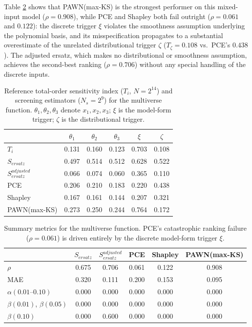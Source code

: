 \documentclass[12pt]{article}
\begin{document}
Table \ref{tab:multiverse_summary} shows that PAWN(max-KS) is the strongest performer on this mixed-input model ($\rho=0.908$), while PCE and Shapley both fail outright ($\rho=0.061$ and $0.122$): the discrete trigger $\xi$ violates the smoothness assumption underlying the polynomial basis, and its misspecification propagates to a substantial overestimate of the unrelated distributional trigger $\zeta$ ($T_\zeta=0.108$ vs.\ PCE's $0.438$). The adjusted ersatz, which makes no distributional or smoothness assumption, achieves the second-best ranking ($\rho=0.706$) without any special handling of the discrete inputs.

\begin{table}[H]
\centering
\begin{tabular}{@{}lccccc@{}} \toprule
 & $\theta_1$ & $\theta_2$ & $\theta_3$ & $\xi$ & $\zeta$ \\ \midrule
$T_i$                   & 0.131 & 0.160 & 0.123 & 0.703 & 0.108 \\
$S_{ersatz}$            & 0.497 & 0.514 & 0.512 & 0.628 & 0.522 \\
$S^{adjusted}_{ersatz}$ & 0.066 & 0.074 & 0.060 & 0.365 & 0.110 \\
PCE                     & 0.206 & 0.210 & 0.183 & 0.220 & 0.438 \\
Shapley                 & 0.167 & 0.161 & 0.144 & 0.207 & 0.321 \\
PAWN(max-KS)            & 0.273 & 0.250 & 0.244 & 0.764 & 0.172 \\ \bottomrule
\end{tabular}
\caption{Reference total-order sensitivity index ($T_i$, $N=2^{14}$) and screening estimators ($N_s=2^9$) for the \citet{saltelli2025} multiverse function. $\theta_1,\theta_2,\theta_3$ denote $x_1,x_2,x_3$; $\xi$ is the model-form trigger; $\zeta$ is the distributional trigger.}
\label{tab:multiverse_function}
\end{table}

\begin{table}[H]
\centering
\begin{tabular}{@{}l|ccccc@{}} \toprule
 & $S_{ersatz}$ & $S^{adjusted}_{ersatz}$ & PCE & Shapley & PAWN(max-KS) \\ \midrule
$\rho$           & 0.675 & 0.706 & 0.061 & 0.122 & 0.908 \\
MAE              & 0.320 & 0.111 & 0.200 & 0.153 & 0.095 \\
$\alpha(0.01\text{--}0.10)$ & 0.000 & 0.000 & 0.000 & 0.000 & 0.000 \\
$\beta(0.01)$, $\beta(0.05)$ & 0.000 & 0.000 & 0.000 & 0.000 & 0.000 \\
$\beta(0.10)$    & 0.000 & 0.600 & 0.000 & 0.000 & 0.000 \\ \bottomrule
\end{tabular}
\caption{Summary metrics for the \citet{saltelli2025} multiverse function. PCE's catastrophic ranking failure ($\rho=0.061$) is driven entirely by the discrete model-form trigger $\xi$.}
\label{tab:multiverse_summary}
\end{table}
\end{document}
